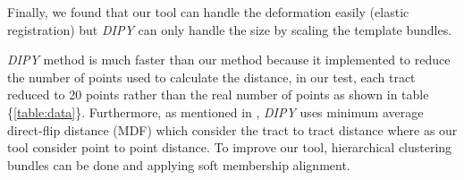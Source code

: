 \documentclass[../structure.tex]{subfiles}
\begin{document}
Finally, we found that our tool can handle the deformation easily (elastic registration) but \textit{DIPY} can only handle the size by scaling the template bundles.

\textit{DIPY} method is much faster than our method because it implemented to reduce the number of points used to calculate the distance, in our test, each tract reduced to 20 points rather than the real number of points as shown in table \{\ref{table:data}\}. Furthermore, as mentioned in \cite{ODonnell2012}, \textit{DIPY} uses minimum average direct-flip distance (MDF) which consider the tract to tract distance where as our tool consider point to point distance. To improve our tool, hierarchical clustering bundles can be done and applying soft membership alignment.
\end{document}
